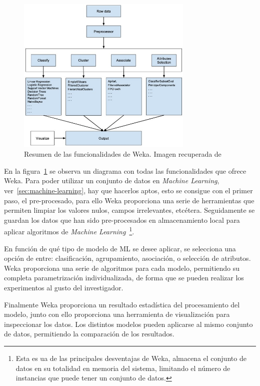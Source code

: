 \begin{figure}
\centering
\includegraphics[width=0.75\textwidth]{../img/memoria/weka-summary}
\caption{Resumen de las funcionalidades de Weka. Imagen recuperada de~\cite{whatisweka}}\label{fig:whatisweka}
\end{figure}

En la figura~\ref{fig:whatisweka} se observa un diagrama con todas las funcionalidades que ofrece Weka. Para poder utilizar un conjunto de datos en \textit{Machine Learning}, ver~\ref{sec:machine-learning}, hay que hacerlos aptos, esto se consigue con el primer paso, el pre-procesado, para ello Weka proporciona una serie de herramientas que permiten limpiar los valores nulos, campos irrelevantes, etcétera. Seguidamente se guardan los datos que han sido pre-procesados en almacenamiento local para aplicar algoritmos de \textit{Machine Learning}~\footnote{Esta es ua de las principales desventajas de Weka, almacena el conjunto de datos en su totalidad en memoria del sistema, limitando el número de instancias que puede tener un conjunto de datos.}.

En función de qué tipo de modelo de ML se desee aplicar, se selecciona una opción de entre: clasificación, agrupamiento, asociación, o selección de atributos. Weka proporciona una serie de algoritmos para cada modelo, permitiendo su completa parametrización individualizada, de forma que se pueden realizar los experimentos al gusto del investigador. 

Finalmente Weka proporciona un resultado estadística del procesamiento del modelo, junto con ello proporciona una herramienta de visualización para inspeccionar los datos. Los distintos modelos pueden aplicarse al mismo conjunto de datos, permitiendo la comparación de los resultados.

